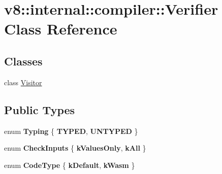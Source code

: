 \hypertarget{classv8_1_1internal_1_1compiler_1_1Verifier}{}\section{v8\+:\+:internal\+:\+:compiler\+:\+:Verifier Class Reference}
\label{classv8_1_1internal_1_1compiler_1_1Verifier}
\subsection*{Classes}
\begin{DoxyCompactItemize}
\item 
class \mbox{\hyperlink{classv8_1_1internal_1_1compiler_1_1Verifier_1_1Visitor}{Visitor}}
\end{DoxyCompactItemize}
\subsection*{Public Types}
\begin{DoxyCompactItemize}
\item 
\mbox{\label{classv8_1_1internal_1_1compiler_1_1Verifier_a78ad088def8544aa3b97a7610387725e}} 
enum {\bfseries Typing} \{ {\bfseries T\+Y\+P\+ED}, 
{\bfseries U\+N\+T\+Y\+P\+ED}
 \}
\item 
\mbox{\label{classv8_1_1internal_1_1compiler_1_1Verifier_a7a26af4705f82708e0143d946405f184}} 
enum {\bfseries Check\+Inputs} \{ {\bfseries k\+Values\+Only}, 
{\bfseries k\+All}
 \}
\item 
\mbox{\label{classv8_1_1internal_1_1compiler_1_1Verifier_a940500618025bfc4f070267e2b999f93}} 
enum {\bfseries Code\+Type} \{ {\bfseries k\+Default}, 
{\bfseries k\+Wasm}
 \}
\end{DoxyCompactItemize}
